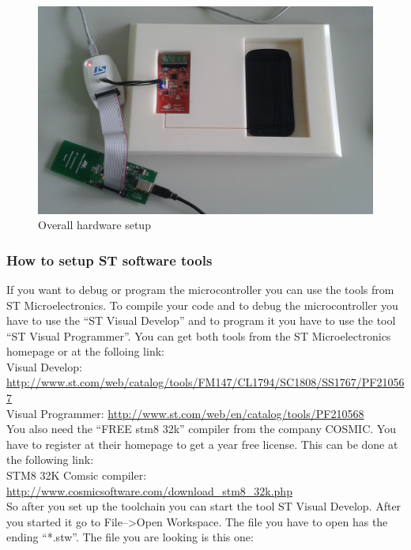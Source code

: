 \documentclass[11pt]{article}
\begin{document}
\begin{figure}[H]

 \centering
 \includegraphics [width=15cm]{hardwaresetup.jpg} 
 \caption{Overall hardware setup}
\end{figure}

\subsubsection{How to setup ST software tools }
If you want to debug or program the microcontroller you can use the tools from ST Microelectronics. To compile your code and to debug the microcontroller you have to use the "`ST Visual Develop"' and to program it you have to use the tool "`ST Visual Programmer"'. You can get both tools from the ST Microelectronics homepage or at the folloing link:\\
Visual Develop: \url{http://www.st.com/web/catalog/tools/FM147/CL1794/SC1808/SS1767/PF210567}\\
Visual Programmer: \url{http://www.st.com/web/en/catalog/tools/PF210568}\\

You also need the "`FREE stm8 32k"' compiler from the company COSMIC. You have to register at their homepage to get a year free license. This can be done at the following link:\\
STM8 32K Comsic compiler: \url{http://www.cosmicsoftware.com/download\_stm8\_32k.php}\\

So after you set up the toolchain you can start the tool ST Visual Develop. After you started it go to File-->Open Workspace. The file you have to open has the ending "`*.stw"'. The file you are looking is this one:
\end{document}
